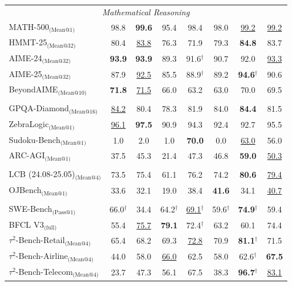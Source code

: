 \begin{table}[t]
{\begin{tabular}{@{}l| c c c c c c c@{}}
\multicolumn{8}{c}{\textit{Mathematical Reasoning}} \\
MATH-500$_\text{(Mean@1)}$ &98.8 &\textbf{99.6} &95.4 &98.4 &98.0 &\underline{99.2} &\underline{99.2}\\
HMMT-25$_\text{(Mean@32)}$ &80.4 &\underline{83.8} &76.3 &71.9 &79.3 &\textbf{84.8} &83.7\\
AIME-24$_\text{(Mean@32)}$ &\textbf{93.9} &\textbf{93.9} &89.3 &91.6$^\dagger$ &90.7 &92.0 &\underline{93.3}\\
AIME-25$_\text{(Mean@32)}$ &87.9 &\underline{92.5} &85.5 &88.9$^\dagger$ &89.2 &\textbf{94.6}$^\dagger$ &90.6\\
BeyondAIME$_\text{(Mean@10)}$ &\textbf{71.8} &\underline{71.5} &66.0 &63.2 &63.0 &70.0 &69.5\\
\midrule
\rowcolor{mygray}


\multicolumn{8}{c}{\textit{General Reasoning}} \\
GPQA-Diamond$_\text{(Mean@16)}$ &\underline{84.2} &80.4 &78.3 &81.9 &84.0 &\textbf{84.4} & 81.5\\
ZebraLogic$_\text{(Mean@1)}$ &\underline{96.1}&\textbf{97.5} &90.9 &94.3 &92.4 &92.7 &{95.5}\\
Sudoku-Bench$_\text{(Mean@1)}$ &1.0 &2.0 &1.0 &\textbf{70.0} &0.0 &\underline{63.0} &56.0\\
ARC-AGI$_\text{(Mean@1)}$ &37.5 &45.3 &21.4 &{47.3} &46.8 &\textbf{59.0} & \underline{50.3}\\
\midrule
\rowcolor{mygray}


\multicolumn{8}{c}{\textit{Coding}} \\
LCB (24.08-25.05)$_\text{(Mean@4)}$ &73.5 &75.4 &61.1 &76.2 &74.2 &\textbf{80.6} &\underline{79.4}\\
OJBench$_\text{(Mean@1)}$ &33.6 &32.1 &19.0 &38.4 &\textbf{41.6} &34.1 &\underline{40.7}\\
\midrule
\rowcolor{mygray}


\multicolumn{8}{c}{\textit{Agentic Tool Using}} \\
SWE-Bench$_\text{(Pass@1)}$ &66.0$^\dagger$ &34.4 &64.2$^\dagger$ &\underline{69.1}$^\dagger$ &59.6$^\dagger$ &\textbf{74.9}$^\dagger$ &59.4\\

BFCL V3$_\text{(full)}$ &55.4 &\underline{75.7} &\textbf{79.1} &72.4$^\dagger$ &63.2 &60.1 &74.4\\

$\tau^2$-Bench-Retail$_\text{(Mean@4)}$ &65.4 &68.2 &69.3 &\underline{72.8} &70.9 &\textbf{81.1}$^\dagger$ &{71.5}\\
$\tau^2$-Bench-Airline$_\text{(Mean@4)}$ &44.0 &58.0 &\underline{66.0} &62.5 &58.0 &{62.6}$^\dagger$ &\textbf{67.5}\\
$\tau^2$-Bench-Telecom$_\text{(Mean@4)}$ &23.7 &47.3 &56.1 &67.5 &38.3 &\textbf{96.7}$^\dagger$ &\underline{83.1}\\


\end{tabular}}
\end{table}
